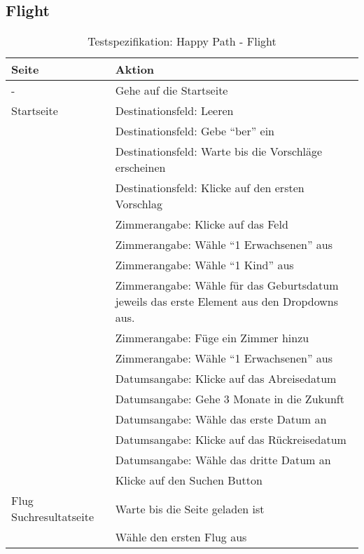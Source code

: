\subsection{Flight}
\begin{table}[H] 
	\caption{Testspezifikation: Happy Path - Flight}
	\centering
		
	\begin{tabularx}{0.9\textwidth}{ | l | X | } 
		\hline 
		\textbf{Seite} & \textbf{Aktion} \\ \hline 
		\multirow{1}{*}{-} & Gehe auf die Startseite \\ \hline
		\multirow{1}{*}{Startseite} & Destinationsfeld: Leeren \\ \cline{2-2}
		& Destinationsfeld: Gebe "`ber"' ein \\ \cline{2-2}
		& Destinationsfeld: Warte bis die Vorschläge erscheinen \\ \cline{2-2}
		& Destinationsfeld: Klicke auf den ersten Vorschlag \\ \cline{2-2}
		& Zimmerangabe: Klicke auf das Feld \\ \cline{2-2}
		& Zimmerangabe: Wähle "`1 Erwachsenen"' aus \\ \cline{2-2}
		& Zimmerangabe: Wähle "`1 Kind"' aus \\ \cline{2-2}
		& Zimmerangabe: Wähle für das Geburtsdatum jeweils das erste Element aus den Dropdowns aus.  \\ \cline{2-2}
		& Zimmerangabe: Füge ein Zimmer hinzu \\ \cline{2-2}
		& Zimmerangabe: Wähle "`1 Erwachsenen"' aus \\ \cline{2-2}
		& Datumsangabe: Klicke auf das Abreisedatum \\ \cline{2-2}
		& Datumsangabe: Gehe 3 Monate in die Zukunft \\ \cline{2-2}
		& Datumsangabe: Wähle das erste Datum an \\ \cline{2-2}
		& Datumsangabe: Klicke auf das Rückreisedatum \\ \cline{2-2}
		& Datumsangabe: Wähle das dritte Datum an \\ \cline{2-2}
		& Klicke auf den Suchen Button \\ \hline
				
		\multirow{1}{*}{Flug Suchresultatseite} & Warte bis die Seite geladen ist \\ \cline{2-2}
		& Wähle den ersten Flug aus \\ \hline
		

\end{tabularx}
\end{table}
